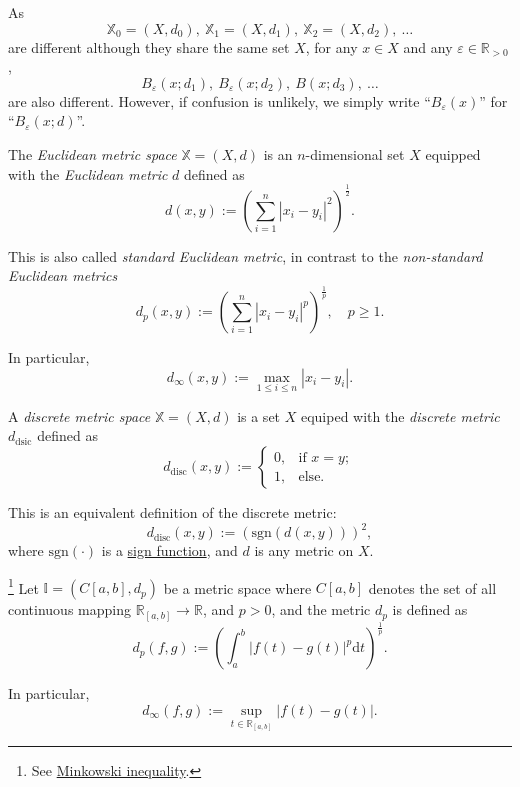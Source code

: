 \begin{note}
	As
	$$
	\mathbb X_0 = (X, d_0), \ \mathbb X_1 = (X, d_1), \ \mathbb X_2 = (X, d_2), \ \ldots
	$$
	are different although they share the same set $X$, for any $x \in X$ and any $\varepsilon \in \mathbb R_{> 0}$,
	$$
	B_\varepsilon(x; d_1),\ B_\varepsilon (x; d_2), \ B(x; d_3), \ \ldots
	$$
	are also different. However, if confusion is unlikely, we simply write ``$B_\varepsilon(x)$'' for ``$B_\varepsilon(x; d)$''.
\end{note}


\begin{example}
	\label{eg: Euclidean metric space}
	The \textit{Euclidean metric space} $\mathbb X = (X, d)$ is an $n$-dimensional set $X$ equipped with the \textit{Euclidean metric} $d$ defined as
	$$
	d(x,y) := \left( \sum_{i = 1}^n |x_i - y_i|^2 \right)^\frac{1}{2}.
	$$
	
	This is also called \textit{standard Euclidean metric}, in contrast to the \textit{non-standard Euclidean metrics}
	$$
	d_p(x,y) := \left( \sum_{i = 1}^n |x_i - y_i|^p \right)^\frac{1}{p}, \quad p \ge 1.
	$$
	
	In particular,
	$$
	d_\infty (x,y) := \max_{1 \le i \le n} |x_i - y_i|.
	$$
\end{example}


\begin{example}
	A \textit{discrete metric space} $\mathbb X = (X, d)$ is a set $X$ equiped with the \textit{discrete metric} $d_\mathrm{dsic}$ defined as
	$$
	d_\mathrm{disc}(x,y) :=
	\begin{cases}
		0, & \text{if $x = y$}; \\
		1, & \text{else}.
	\end{cases}
	$$
	
	This is an equivalent definition of the discrete metric:
	$$
	d_\mathrm{disc}(x, y) := (\mathrm{sgn}(d(x,y)))^2,
	$$
	where $\mathrm{sgn}(\cdot)$ is a \href{https://en.wikipedia.org/wiki/Sign_function}{sign function}, and $d$ is any metric on $X$.
\end{example}


\begin{example}
	\footnote{
		See \href{https://en.wikipedia.org/wiki/Minkowski_inequality}{Minkowski inequality}.
	}
	Let $\mathbb I = (C{[a,b]}, d_p)$ be a metric space where $C{[a,b]}$ denotes the set of all continuous mapping $\mathbb R_{[a,b]} \to \mathbb R$, and $p > 0$, and the metric $d_p$ is defined as
	$$
	d_p(f, g) := \left( \int_{a}^{b} |f(t) - g(t)|^p \mathrm{d} t \right)^\frac{1}{p}.
	$$
	
	In particular,
	$$
	d_\infty (f,g) := \sup_{t \in \mathbb R_{[a,b]}} |f(t) - g(t)|.
	$$
\end{example}


